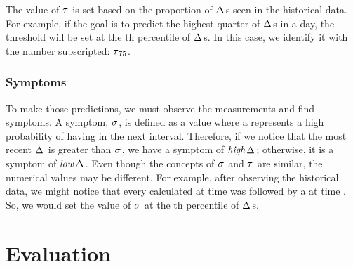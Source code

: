 \documentclass{llncs}
\newcommand{\ourDelta}[2][]{\ensuremath{\Delta\textsuperscript{\text{#1}}
\textsubscript{\text{#2}}}}
\newcommand{\high}[1][ ]{\ensuremath{\text{\emph{high}}#1}}
\newcommand{\low}[1][ ]{\ensuremath{\text{\emph{low}}#1}}
\newcommand{\highDelta}[2][]{\high{\ourDelta[#1]{#2}}}
\newcommand{\lowDelta}[2][]{\low{\ourDelta[#1]{#2}}}
\newcommand{\threshold}[1][]{\ensuremath{\tau\textsubscript{#1}}}
\newcommand{\symptom}[1][]{\ensuremath{\sigma\textsubscript{#1}}}
\begin{document}
The value of \threshold{} is set based on the proportion of \ourDelta{}s seen 
in the historical data. For example, if the goal is to predict the highest 
quarter of \ourDelta{}s in a day, the threshold will be set at the th 
percentile of \ourDelta{}s. In this case, we identify it with the number  
subscripted: \threshold[75].
\begin{comment}
As an example, Figure~\ref{fig:plot_rectangles} shows the measurements of the 
temperature and relative humidity sensors done during a day, 
and the blue background represents the intervals with \highDelta{RH}s, 
considering \threshold[70]. During these intervals, the \emph{Network B} should 
have 
activated a plan to report more data and produced more detailed 
information, since significant changes in the environment are 
generally more interesting and critical to report.


\begin{figure}[h]
	\centering
	\texttt{[image: plot\_rectangles2]}
	\caption{Values observed during a day.}
	\label{fig:plot_rectangles}
\end{figure}
\end{comment}

\subsubsection{Symptoms}
\label{sec:symptom-definition}

To make those predictions, we must observe the measurements and find 
symptoms. A symptom, \symptom{}, is defined as a value where a 
 represents a high probability of having 
 in the next interval. Therefore, if we 
notice that the most recent \ourDelta{} is greater than \symptom{}, we have a 
symptom of \highDelta{}; otherwise, it is a symptom of \lowDelta{}.
Even though the concepts of \symptom{} and \threshold{} are similar, the 
numerical values may be different. For example, after observing the historical 
data, we might notice that every  calculated at 
time  was followed by a  at time . So, 
we would set the value of \symptom{} at the th percentile of \ourDelta{}s.



\section{Evaluation}
\label{sec:evaluation}
\end{document}
